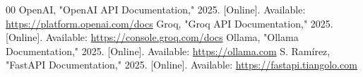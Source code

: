 \documentclass[conference]{IEEEtran}
\begin{document}
\begin{thebibliography}{00}
 OpenAI, "OpenAI API Documentation," 2025. [Online]. Available: \url{https://platform.openai.com/docs}
 Groq, "Groq API Documentation," 2025. [Online]. Available: \url{https://console.groq.com/docs}
 Ollama, "Ollama Documentation," 2025. [Online]. Available: \url{https://ollama.com}
 S. Ramírez, "FastAPI Documentation," 2025. [Online]. Available: \url{https://fastapi.tiangolo.com}
\end{thebibliography}
\end{document}
